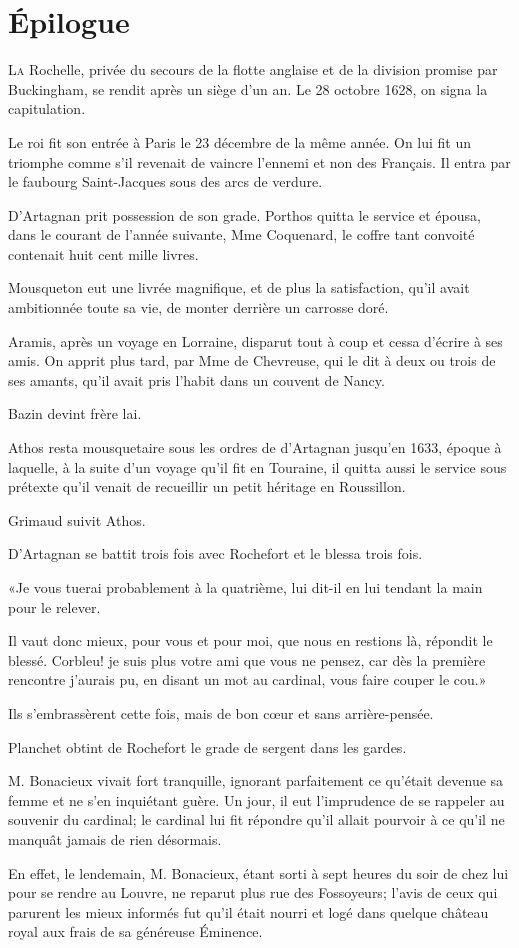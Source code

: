 
\chapter{Épilogue}

\lettrine{L}{a} Rochelle, privée du secours de la flotte anglaise et de la division promise par Buckingham, se rendit après un siège d'un an. Le 28 octobre 1628, on signa la capitulation. 

\zz
Le roi fit son entrée à Paris le 23 décembre de la même année. On lui fit un triomphe comme s'il revenait de vaincre l'ennemi et non des Français. Il entra par le faubourg Saint-Jacques sous des arcs de verdure. 

D'Artagnan prit possession de son grade. Porthos quitta le service et épousa, dans le courant de l'année suivante, Mme Coquenard, le coffre tant convoité contenait huit cent mille livres. 

Mousqueton eut une livrée magnifique, et de plus la satisfaction, qu'il avait ambitionnée toute sa vie, de monter derrière un carrosse doré. 

Aramis, après un voyage en Lorraine, disparut tout à coup et cessa d'écrire à ses amis. On apprit plus tard, par Mme de Chevreuse, qui le dit à deux ou trois de ses amants, qu'il avait pris l'habit dans un couvent de Nancy. 

Bazin devint frère lai. 

Athos resta mousquetaire sous les ordres de d'Artagnan jusqu'en 1633, époque à laquelle, à la suite d'un voyage qu'il fit en Touraine, il quitta aussi le service sous prétexte qu'il venait de recueillir un petit héritage en Roussillon. 

Grimaud suivit Athos. 

D'Artagnan se battit trois fois avec Rochefort et le blessa trois fois. 

«Je vous tuerai probablement à la quatrième, lui dit-il en lui tendant la main pour le relever. 

\speak  Il vaut donc mieux, pour vous et pour moi, que nous en restions là, répondit le blessé. Corbleu! je suis plus votre ami que vous ne pensez, car dès la première rencontre j'aurais pu, en disant un mot au cardinal, vous faire couper le cou.» 

Ils s'embrassèrent cette fois, mais de bon cœur et sans arrière-pensée. 

Planchet obtint de Rochefort le grade de sergent dans les gardes. 

M. Bonacieux vivait fort tranquille, ignorant parfaitement ce qu'était devenue sa femme et ne s'en inquiétant guère. Un jour, il eut l'imprudence de se rappeler au souvenir du cardinal; le cardinal lui fit répondre qu'il allait pourvoir à ce qu'il ne manquât jamais de rien désormais. 

En effet, le lendemain, M. Bonacieux, étant sorti à sept heures du soir de chez lui pour se rendre au Louvre, ne reparut plus rue des Fossoyeurs; l'avis de ceux qui parurent les mieux informés fut qu'il était nourri et logé dans quelque château royal aux frais de sa généreuse Éminence.